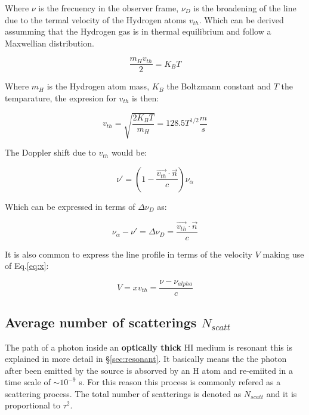 Where $\nu$ is the frecuency in the observer frame,
$\nu_D$ is the broadening of the line due to the termal
velocity of the Hydrogen atoms $v_{th}$. Which can be derived
assumming that the Hydrogen gas is in thermal equilibrium
and follow a Maxwellian distribution.

\begin{equation}
\dfrac{m_H v_{th}}{2} = K_B T 
\end{equation}

Where $m_H$ is the Hydrogen atom mass, $K_B$ the Boltzmann constant and $T$
the temparature, the expresion for $v_{th}$ is then:

\begin{equation}
v_{th} = \sqrt{\dfrac{2 K_B T}{m_H}} = 128.5 T^{1/2}\dfrac{m}{s}
\end{equation}

The Doppler shift due to $v_{th}$ would be:

\begin{equation}
\nu'= (1 - \dfrac{\vec{v_{th}}\cdot\vec{n}}{c})\nu_{\alpha}
\end{equation}

Which can be expressed in terms of $\Delta \nu_D$ as:

\begin{equation}
\nu_{\alpha} - \nu' = \Delta\nu_D =  \dfrac{\vec{v_{th}}\cdot\vec{n}}{c}
\end{equation}

It is also common to express the line profile in terms of the velocity $V$
making use of Eq.\ref{eq:x}:

\begin{equation}
V = xv_{th} = \dfrac{\nu - \nu_{alpha}}c
\end{equation}

\subsection{Average number of scatterings $N_{scatt}$}

The path of a \ly photon inside an {\bf{optically thick}}
HI medium is resonant this is explained in more detail 
in \S \ref{sec:resonant}. It basically means the the \ly photon
after been emitted by the source is absorved by an H atom
and re-emiited in a time scale of $\sim 10^{-9}$ s.
For this reason this process is commonly refered as
a scattering process. The total number of scatterings
is denoted as $N_{scatt}$ and it is proportional to
$\tau^2$.



